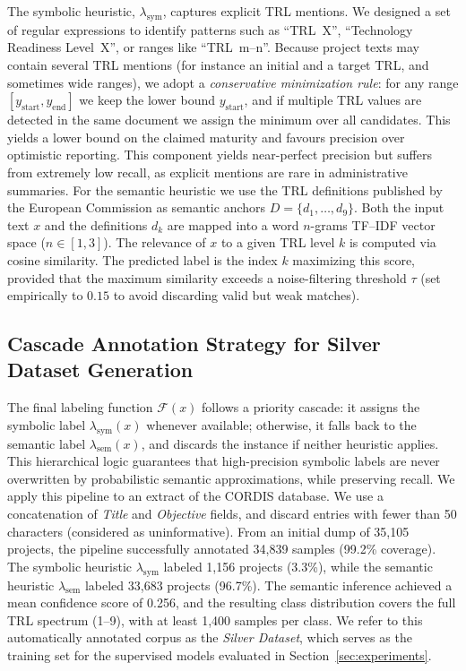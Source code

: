 \documentclass[runningheads]{llncs}
\begin{document}
\color{black}

The symbolic heuristic, $\lambda_{\text{sym}}$, captures explicit TRL mentions. We
designed a set of regular expressions to identify patterns such as ``TRL~X'',
``Technology Readiness Level~X'', or ranges like ``TRL~m--n''. Because project
texts may contain several TRL mentions (for instance an initial and a target
TRL, and sometimes wide ranges), we adopt a \emph{conservative minimization
rule}: for any range $[y_{\text{start}}, y_{\text{end}}]$ we keep the lower
bound $y_{\text{start}}$, and if multiple TRL values are detected in the same
document we assign the minimum over all candidates. This yields a lower bound
on the claimed maturity and favours precision over optimistic reporting.
This component yields near-perfect precision but suffers from extremely low
recall, as explicit mentions are rare in administrative summaries.
For the semantic heuristic we use the TRL definitions published by the European Commission as semantic anchors
$D = \{d_1, \dots, d_9\}$. Both the input text $x$ and the definitions $d_k$
are mapped into a word $n$-grams TF--IDF vector space ($n \in [1,3]$). 
The relevance of $x$ to a given
TRL level $k$ is computed via cosine similarity. The predicted label is the
index $k$ maximizing this score, provided that the maximum similarity exceeds a
noise-filtering threshold $\tau$ (set empirically to $0.15$ to avoid discarding valid but weak matches).


\subsection{Cascade Annotation Strategy for Silver Dataset Generation}

The final labeling function $\mathcal{F}(x)$ follows a priority cascade: it assigns the symbolic label $\lambda_{\text{sym}}(x)$ whenever available; otherwise, it falls back to the semantic label $\lambda_{\text{sem}}(x)$, and discards the instance if neither heuristic applies. 
This hierarchical logic guarantees that high-precision symbolic labels are never
overwritten by probabilistic semantic approximations, while preserving recall. %
We apply this pipeline to an extract of the CORDIS database. We use a concatenation of \emph{Title} and \emph{Objective} fields, and discard entries with
fewer than 50 characters (considered as uninformative).
From an initial dump of 35,105 projects, the pipeline successfully annotated
34,839 samples (99.2\% coverage). The symbolic heuristic
$\lambda_{\text{sym}}$ labeled 1,156 projects (3.3\%), while the semantic
heuristic $\lambda_{\text{sem}}$ labeled 33,683 projects (96.7\%). The semantic
inference achieved a mean confidence score of 0.256, and the resulting class
distribution covers the full TRL spectrum (1--9), with at least 1,400 samples
per class. We refer to this automatically annotated corpus as the
\emph{Silver Dataset}, which serves as the training set for the supervised models evaluated in Section~\ref{sec:experiments}.
\end{document}
